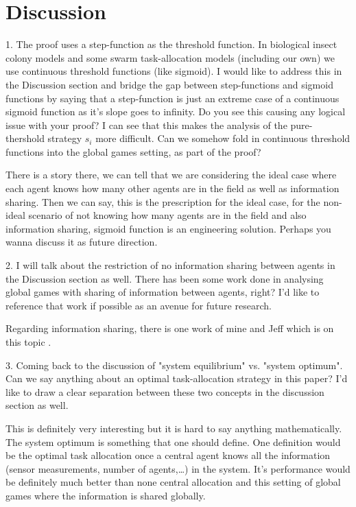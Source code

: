 \documentclass[conference]{ieeeconf}
\begin{document}
\section{Discussion}\label{sec:disc}
1. The proof uses a step-function as the threshold function. In biological insect colony models and some swarm task-allocation models (including our own) we use continuous threshold functions (like sigmoid). I would like to address this in the Discussion section and bridge the gap between step-functions and sigmoid functions by saying that a step-function is just an extreme case of a continuous sigmoid function as it's slope goes to infinity. Do you see this causing any logical issue with your proof? I can see that this makes the analysis of the pure-thershold strategy $s_i$ more difficult. Can we somehow fold in continuous threshold functions into the global games setting, as part of the proof?

There is a story there, we can tell that we are considering the ideal case where each agent knows how many other agents are in the field as well as information sharing. Then we can say, this is the prescription for the ideal case, for the non-ideal scenario of not knowing how many agents are in the field and also information sharing, sigmoid function is an engineering solution. Perhaps you wanna discuss it as future direction. 

2. I will talk about the restriction of no information sharing between agents in the Discussion section as well. There has been some work done in analysing global games with sharing of information between agents, right? I'd like to reference that work if possible as an avenue for future research.

Regarding information sharing, there is one work of mine and Jeff which is on this topic \cite{Touri2014}.

3. Coming back to the discussion of "system equilibrium" vs. "system optimum". Can we say anything about an optimal task-allocation strategy in this paper? I'd like to draw a clear separation between these two concepts in the discussion section as well. 

This is definitely very interesting but it is hard to say anything mathematically. The system optimum is something that one should define. One definition would be the optimal task allocation once a central agent knows all the information (sensor measurements, number of agents,…) in the system. It’s performance would be definitely much better than none central allocation and this setting of global games where the information is shared globally. 
\end{document}
